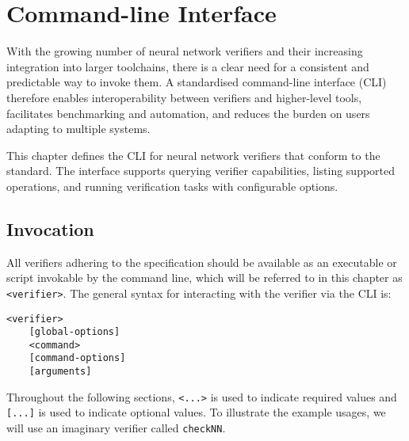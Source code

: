 \chapter{Command-line Interface}
\label{sec:solver_interface}

\newcommand{\clOutputOption}[3]{
\paragraph{\texttt{#1}}
\begin{itemize}
    \item \textbf{Description}: #2
    \item \textbf{Output}: #3
    \item \textbf{Example usage}:
\end{itemize}
}

\newcommand{\clOption}[3]{
\paragraph{\texttt{#1}}
\begin{itemize}
    \item \textbf{Description}: #2
    \item \textbf{Example usage}: \texttt{#3}
\end{itemize}
}


\newcommand{\exampleVerifier}{checkNN}

With the growing number of neural network verifiers and their increasing integration into larger toolchains, there is a clear need for a consistent and predictable way to invoke them. A standardised command-line interface (CLI) therefore enables interoperability between verifiers and higher-level tools, facilitates benchmarking and automation, and reduces the burden on users adapting to multiple systems.

This chapter defines the CLI for neural network verifiers that conform to the \vnnlib{} standard. The interface supports querying verifier capabilities, listing supported operations, and running verification tasks with configurable options.

\section{Invocation}

All verifiers adhering to the \vnnlib{} specification should be available as an executable or script invokable by the command line, which will be referred to in this chapter as \texttt{<verifier>}. The general syntax for interacting with the verifier via the CLI is:
\begin{lstlisting}[style=bash]
<verifier>
    [global-options] 
    <command> 
    [command-options] 
    [arguments] 
\end{lstlisting}
Throughout the following sections, \texttt{<...>} is used to indicate required values and \texttt{[...]} is used to indicate optional values. To illustrate the example usages, we will  use an imaginary verifier called \texttt{\exampleVerifier}.

